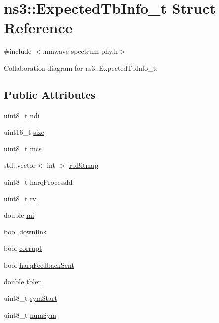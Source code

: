 \hypertarget{structns3_1_1ExpectedTbInfo__t}{}\section{ns3\+:\+:Expected\+Tb\+Info\+\_\+t Struct Reference}
\label{structns3_1_1ExpectedTbInfo__t}


{\ttfamily \#include $<$mmwave-\/spectrum-\/phy.\+h$>$}



Collaboration diagram for ns3\+:\+:Expected\+Tb\+Info\+\_\+t\+:
\subsection*{Public Attributes}
\begin{DoxyCompactItemize}
\item 
uint8\+\_\+t \hyperlink{structns3_1_1ExpectedTbInfo__t_aa8f416c82d9c5313e5e81e177beb8312}{ndi}
\item 
uint16\+\_\+t \hyperlink{structns3_1_1ExpectedTbInfo__t_aef09532dd50e1eb35b3a3174b25981fd}{size}
\item 
uint8\+\_\+t \hyperlink{structns3_1_1ExpectedTbInfo__t_a3a606ab3068a167812120e4883ce73df}{mcs}
\item 
std\+::vector$<$ int $>$ \hyperlink{structns3_1_1ExpectedTbInfo__t_a8fefa4f579125f204cccb5f6056063b5}{rb\+Bitmap}
\item 
uint8\+\_\+t \hyperlink{structns3_1_1ExpectedTbInfo__t_afb904876b825d57ec8c3d86a21bbecc2}{harq\+Process\+Id}
\item 
uint8\+\_\+t \hyperlink{structns3_1_1ExpectedTbInfo__t_a9c96ee4c0c2454056f63e9af8dab0ef0}{rv}
\item 
double \hyperlink{structns3_1_1ExpectedTbInfo__t_a5d3640527e6204d8da132e0b45716bb2}{mi}
\item 
bool \hyperlink{structns3_1_1ExpectedTbInfo__t_aabdf7c770a091fccb14ff22d037762c0}{downlink}
\item 
bool \hyperlink{structns3_1_1ExpectedTbInfo__t_a69c84ea297e27d1c7ee3efcf9c19b01e}{corrupt}
\item 
bool \hyperlink{structns3_1_1ExpectedTbInfo__t_a13999cb5ee50d9eee90f366b86247999}{harq\+Feedback\+Sent}
\item 
double \hyperlink{structns3_1_1ExpectedTbInfo__t_aae2e167ee387ee189e3c17d5f44c43ac}{tbler}
\item 
uint8\+\_\+t \hyperlink{structns3_1_1ExpectedTbInfo__t_a61e47605cfadaf90f8592c95ba9e8758}{sym\+Start}
\item 
uint8\+\_\+t \hyperlink{structns3_1_1ExpectedTbInfo__t_a417b96ca12be4e43c5d37c9824bf5f7d}{num\+Sym}
\end{DoxyCompactItemize}


